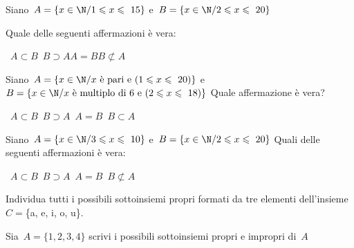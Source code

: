 \begin{esercizio}
\label{ese:7.39}
Siano~\(A=\{x\in\N/1\leqslant x\leqslant~15\}\) e~\(B=\{x\in\N/2\leqslant 
x\leqslant~20\}\)
\begin{center}

\end{center}
Quale delle seguenti affermazioni è vera:
\begin{center}
\boxA\quad~\(A\subset B\)\quad\boxB\quad~\(B\supset 
A\)\quad\boxC\quad\(A=B\)\quad\boxD\quad\(B\not\subset A\)
\end{center}
\end{esercizio}

\begin{esercizio}
\label{ese:7.40}
 Siano~\(A=\{x\in\N/x \text{ è pari e }(1\leqslant x\leqslant~20)\}\) 
e~\(B=\{x\in\N/x \text{ è multiplo di~6 e }(2\leqslant x\leqslant~18)\}\)
Quale affermazione è vera?
\begin{center}
 \boxA\quad~\(A\subset B\)\quad\boxB\quad~\(B\supset 
A\)\quad\boxC\quad~\(A=B\)\quad\boxD\quad~\(B\subset A\)
\end{center}
\end{esercizio}

\begin{esercizio}
\label{ese:7.41}
Siano~\(A=\{x\in\N/3\leqslant x\leqslant~10\}\) e~\(B=\{x\in\N/2\leqslant 
x\leqslant~20\}\)
Quali delle seguenti affermazioni è vera:
\begin{center}
 \boxA\quad~\(A\subset B\)\quad\boxB\quad~\(B\supset 
A\)\quad\boxC\quad~\(A=B\)\quad\boxD\quad~\(B\not\subset A\)
\end{center}
\end{esercizio}

\begin{esercizio}
\label{ese:7.42}
Individua tutti i possibili sottoinsiemi propri formati da tre elementi 
dell'insieme~\(C=\)\{a, e, i, o, u\}.
\end{esercizio}

\begin{esercizio}
\label{ese:7.43}
Sia~\(A=\{1,2,3,4\}\) scrivi i possibili sottoinsiemi propri e impropri 
di~\(A\)
\end{esercizio}

